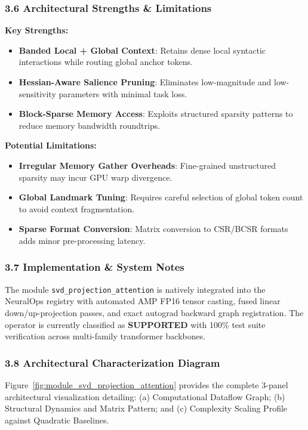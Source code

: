 \subsubsection*{3.6 Architectural Strengths \& Limitations}
\textbf{Key Strengths:}
\begin{itemize}
    \item \textbf{Banded Local + Global Context}: Retains dense local syntactic interactions while routing global anchor tokens.
    \item \textbf{Hessian-Aware Salience Pruning}: Eliminates low-magnitude and low-sensitivity parameters with minimal task loss.
    \item \textbf{Block-Sparse Memory Access}: Exploits structured sparsity patterns to reduce memory bandwidth roundtrips.
\end{itemize}

\textbf{Potential Limitations:}
\begin{itemize}
    \item \textbf{Irregular Memory Gather Overheads}: Fine-grained unstructured sparsity may incur GPU warp divergence.
    \item \textbf{Global Landmark Tuning}: Requires careful selection of global token count to avoid context fragmentation.
    \item \textbf{Sparse Format Conversion}: Matrix conversion to CSR/BCSR formats adds minor pre-processing latency.
\end{itemize}

\subsubsection*{3.7 Implementation \& System Notes}
The module \texttt{svd\_projection\_attention} is natively integrated into the NeuralOps registry with automated AMP FP16 tensor casting, fused linear down/up-projection passes, and exact autograd backward graph registration. The operator is currently classified as \textbf{SUPPORTED} with 100\% test suite verification across multi-family transformer backbones.

\subsubsection*{3.8 Architectural Characterization Diagram}
Figure~\ref{fig:module_svd_projection_attention} provides the complete 3-panel architectural visualization detailing: (a) Computational Dataflow Graph; (b) Structural Dynamics and Matrix Pattern; and (c) Complexity Scaling Profile against Quadratic Baselines.

